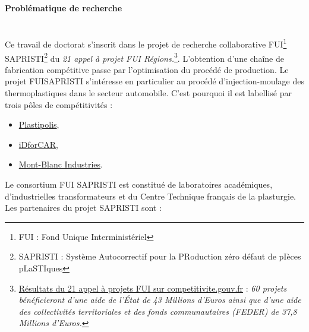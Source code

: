\bigskip
\paragraph{Problématique de recherche}\mbox{} \\

Ce travail de doctorat s'inscrit dans le projet de recherche collaborative FUI\footnote{FUI : Fond Unique Interministériel} SAPRISTI\footnote{SAPRISTI : Système Autocorrectif pour la PRoduction zéro défaut de pIèces pLaSTIques} du \textit{21 appel à projet FUI Régions.}\footnote{\href{https://competitivite.gouv.fr/les-appels-a-projets-de-r-d-fui/le-21e-appel-a-projets/les-resultats-du-21e-appel-a-projets-787.html}{Résultats du 21 appel à projets FUI sur competitivite.gouv.fr} : \textit{60 projets bénéficieront d’une aide de l’État de 43 Millions d'Euros ainsi que d’une aide des collectivités territoriales et des fonds communautaires (FEDER) de 37,8 Millions d'Euros.}}.
L’obtention d’une chaîne de fabrication compétitive passe par l’optimisation du procédé de production.
Le projet FUISAPRISTI s'intéresse en particulier au procédé d'injection-moulage des thermoplastiques dans le secteur automobile.
C'est pourquoi il est labellisé par trois pôles de compétitivités :
\begin{itemize}
	\item \href{http://www.plastipolis.fr/}{Plastipolis},
	\item \href{https://www.id4car.org}{iDforCAR},
	\item \href{https://www.montblancindustries.com/}{Mont-Blanc Industries}.
\end{itemize}
\noindent
Le consortium FUI SAPRISTI est constitué de laboratoires académiques, d'industrielles transformateurs et du Centre Technique français de la plasturgie.
Les partenaires du projet SAPRISTI sont :
